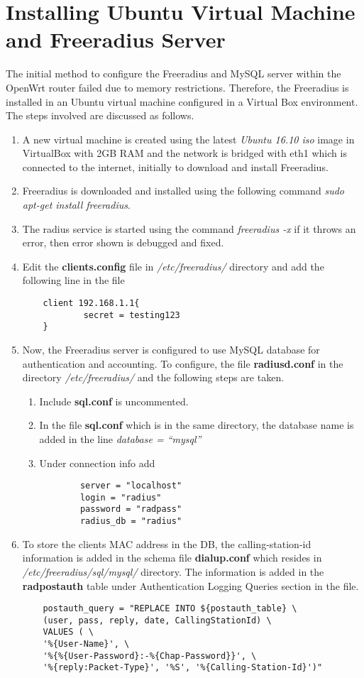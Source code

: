 \section{Installing Ubuntu Virtual Machine and Freeradius Server \cite{Freeradius_install}}
The initial method to configure the Freeradius and MySQL server within the OpenWrt router failed due to memory restrictions. Therefore, the Freeradius is installed in an Ubuntu virtual machine configured in a Virtual Box environment. The steps involved are discussed as follows.
\begin{enumerate}
	\item A new virtual machine is created using the latest \textit{Ubuntu 16.10 iso} image in VirtualBox with 2GB RAM and the network is bridged with eth1 which is connected to the internet, initially to download and install Freeradius.
	\item Freeradius is downloaded and installed using the following command \textit{sudo apt-get install freeradius}.
	\item The radius service is started using the command \textit{freeradius -x} if it throws an error, then error shown is debugged and fixed.
	\item Edit the \textbf{clients.config} file in \textit{/etc/freeradius/} directory and add the following line in the file 
	\begin{lstlisting}
	client 192.168.1.1{
			secret = testing123
	}
	\end{lstlisting}
	
	\item Now, the Freeradius server is configured to use MySQL database for authentication and accounting. To configure, the file \textbf{radiusd.conf} in the directory \textit{/etc/freeradius/} and the following steps are taken.
	\begin{enumerate}
		\item Include \textbf{sql.conf} is uncommented.
		\item In the file \textbf{sql.conf} which is in the same directory, the database name is added in the line \textit{database = “mysql”}
		\item Under connection info add 
		\begin{lstlisting}
		server = "localhost"
		login = "radius"
		password = "radpass"
		radius_db = "radius"
		\end{lstlisting}
	\end{enumerate}
	
	\item To store the clients MAC address in the DB, the calling-station-id information is added in the schema file \textbf{dialup.conf} which resides in \textit{/etc/freeradius/sql/mysql/} directory. The information is added in the \textbf{radpostauth} table under Authentication Logging Queries section in the file.
	\begin{lstlisting}
	postauth_query = "REPLACE INTO ${postauth_table} \
	(user, pass, reply, date, CallingStationId) \
	VALUES ( \
	'%{User-Name}', \
	'%{%{User-Password}:-%{Chap-Password}}', \
	'%{reply:Packet-Type}', '%S', '%{Calling-Station-Id}')"
	\end{lstlisting}


\end{enumerate}
